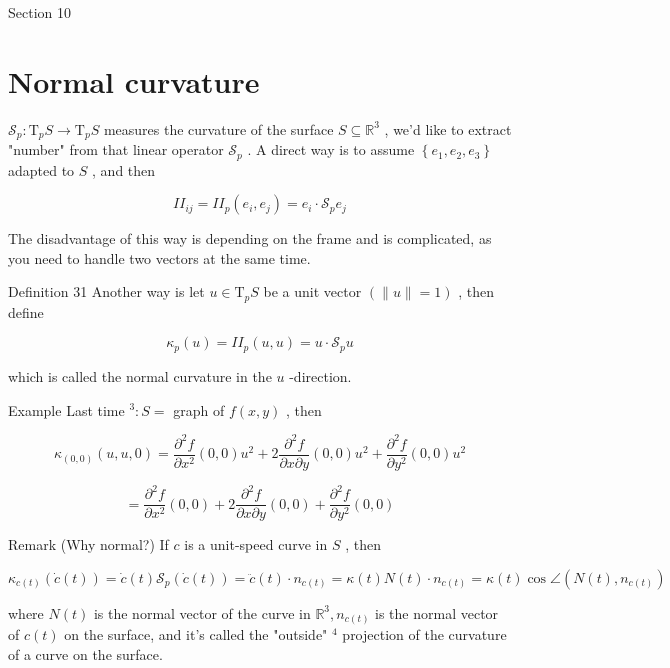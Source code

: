 \documentclass[lang=cn,a4paper,11pt,openany,twoside]{elegantbook}
\begin{document}
Section 10

\section*{Normal curvature}

\({\mathcal{S}}_{p} : {\mathrm{T}}_{p}S \rightarrow  {\mathrm{T}}_{p}S\) measures the curvature of the surface \(S \subseteq  {\mathbb{R}}^{3}\) , we’d like to extract "number" from that linear operator \({\mathcal{S}}_{p}\) . A direct way is to assume \(\left\{  {{e}_{1},{e}_{2},{e}_{3}}\right\}\) adapted to \(S\) , and then

\[
I{I}_{ij} = I{I}_{p}\left( {{e}_{i},{e}_{j}}\right)  = {e}_{i} \cdot  {\mathcal{S}}_{p}{e}_{j}
\]

The disadvantage of this way is depending on the frame and is complicated, as you need to handle two vectors at the same time.

Definition 31 Another way is let \(u \in  {\mathrm{T}}_{p}S\) be a unit vector \(\left( {\parallel u\parallel  = 1}\right)\) , then define

\[
{\kappa }_{p}\left( u\right)  = I{I}_{p}\left( {u,u}\right)  = u \cdot  {\mathcal{S}}_{p}u
\]

which is called the normal curvature in the \(u\) -direction.

Example Last time \({}^{3} : S =\) graph of \(f\left( {x,y}\right)\) , then

\[
{\kappa }_{\left( 0,0\right) }\left( {u,u,0}\right)  = \frac{{\partial }^{2}f}{\partial {x}^{2}}\left( {0,0}\right) {u}^{2} + 2\frac{{\partial }^{2}f}{\partial x\partial y}\left( {0,0}\right) {u}^{2} + \frac{{\partial }^{2}f}{\partial {y}^{2}}\left( {0,0}\right) {u}^{2}
\]

\[
= \frac{{\partial }^{2}f}{\partial {x}^{2}}\left( {0,0}\right)  + 2\frac{{\partial }^{2}f}{\partial x\partial y}\left( {0,0}\right)  + \frac{{\partial }^{2}f}{\partial {y}^{2}}\left( {0,0}\right)
\]

Remark (Why normal?) If \(c\) is a unit-speed curve in \(S\) , then

\[
{\kappa }_{c\left( t\right) }\left( {\dot{c}\left( t\right) }\right)  = \dot{c}\left( t\right) {\mathcal{S}}_{p}\left( {\dot{c}\left( t\right) }\right)  = \ddot{c}\left( t\right)  \cdot  {n}_{c\left( t\right) } = \kappa \left( t\right) N\left( t\right)  \cdot  {n}_{c\left( t\right) } = \kappa \left( t\right) \cos \angle \left( {N\left( t\right) ,{n}_{c\left( t\right) }}\right)
\]

where \(N\left( t\right)\) is the normal vector of the curve in \({\mathbb{R}}^{3},{n}_{c\left( t\right) }\) is the normal vector of \(c\left( t\right)\) on the surface, and it's called the "outside" \({}^{4}\) projection of the curvature of a curve on the surface.
\end{document}

